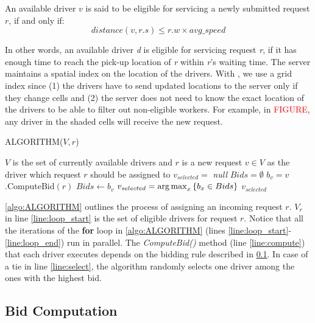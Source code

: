 \begin{definition} 
An available driver $v$ is said to be eligible for servicing a newly submitted request $r$, if and only if:
\begin{equation*}
distance(v, r.s) \leq r.w \times avg\_speed
\end{equation*}
\end{definition}

\noindent In other words, an available driver \textit{d} is eligible for servicing request \textit{r}, if it has enough time to reach the pick-up location of \textit{r} within \textit{r}'s waiting time. The server maintains a spatial index on the location of the drivers. With \fname, we use a grid index since (1) the drivers have to send updated locations to the server only if they change cells and (2) the server does not need to know the exact location of the drivers to be able to filter out non-eligible workers. For example, in \textcolor{red}{FIGURE}, any driver in the shaded cells will receive the new request.

\begin{algorithm}
\caption{ALGORITHM($V, r$)}
\label{algo:ALGORITHM}
\begin{algorithmic}[1]
\REQUIRE $V$ is the set of currently available drivers and $r$ is a new request
\ENSURE $v \in V$ as the driver which request $r$ should be assigned to
\STATE $v_{selected} = $ \emph{null}
\STATE $Bids = \emptyset$
 \label{line:loop_start}
	\STATE $b_v = v$.ComputeBid$(r)$ \label{line:compute}
	\STATE $Bids \leftarrow  b_v$
\ENDFOR \label{line:loop_end}
\STATE $v_{selected} = \operatorname*{arg\,max}_x \left\lbrace b_x \in Bids \right\rbrace$ \label{line:select}
\RETURN $v_{selected}$
\end{algorithmic}
\end{algorithm}

\cref{algo:ALGORITHM} outlines the process of assigning an incoming request $r$. $V_r$ in line \ref{line:loop_start} is the set of eligible drivers for request $r$. Notice that all the iterations of the \textbf{for} loop in \cref{algo:ALGORITHM} (lines \ref{line:loop_start}-\ref{line:loop_end}) run in parallel. The \emph{ComputeBid()} method (line \ref{line:compute}) that each driver executes depends on the bidding rule described in \cref{subsec:bidcomp}. In case of a tie in line \ref{line:select}, the algorithm randomly selects one driver among the ones with the highest bid.

\subsection{Bid Computation}
\label{subsec:bidcomp}

